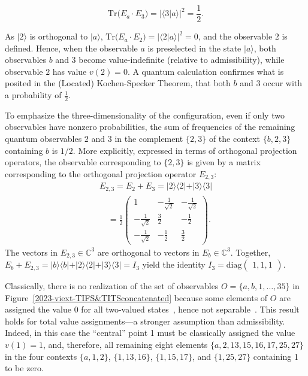 \documentclass[%
 reprint,
 superscriptaddress,
 showpacs,
 showkeys,
 nofootinbib,
  amsmath,amssymb,
 pra,
  longbibliography,
  floatfix,
 ]{revtex4-2}
\theoremstyle{definition}
\newcommand{\C}{\mathbb{C}}
\begin{document}
\begin{equation*}
\text{Tr}\big(E_a \cdot E_3 \big) = \vert \langle 3 \vert a \rangle \vert^2 = \frac12.
\end{equation*}

As $\vert 2 \rangle$ is orthogonal to $\vert a \rangle$,
$\text{Tr}\big(E_a \cdot E_2 \big) = \vert \langle 2 \vert a \rangle \vert^2 = 0$,
and the observable $2$ is defined.
Hence, when the observable $a$ is preselected in the state $\vert a \rangle$, both observables $b$ and $3$ become value-indefinite (relative to admissibility),
while observable $2$ has value  $v(2) = 0$.
A quantum calculation confirmes what is posited in the (Located) Kochen-Specker Theorem,
that both $b$ and $3$ occur with a probability of $\frac12$.


To emphasize the three-dimensionality of the configuration, even if only two observables have nonzero probabilities,  the sum of frequencies of the remaining quantum observables $2$ and $3$
 in the complement  $\{2,3\}$ of the context $\{b,2,3\}$ containing $b$ is $1/2$.
More explicitly, expressed in terms of orthogonal projection operators, the observable corresponding to $\{2,3\}$
is given by a  matrix  corresponding to the orthogonal projection operator $E_{2,3}$:
\begin{equation}
\begin{split}
E_{2,3}=E_2 + E_3 = \vert 2 \rangle \langle 2 \vert + \vert 3 \rangle \langle 3 \vert \\
\quad = \frac12
\begin{pmatrix}
1 & -\frac1{\sqrt{2}}& -\frac1{\sqrt{2}}\\
-\frac1{\sqrt{2}}& \frac32& -\frac12\\
-\frac1{\sqrt{2}}& -\frac12& \frac32
\end{pmatrix}
.
\end{split}
\label{2023-viext-sumotopo}
\end{equation}
The vectors in $E_{2,3}\in \C^3$ are orthogonal to vectors in  $E_{b}\in \C^3$.
Together, $E_b+E_{2,3} =\vert b \rangle \langle b \vert +\vert 2 \rangle \langle 2 \vert + \vert 3 \rangle \langle 3 \vert =I_3$ yield
the identity $I_3=\text{diag}\begin{pmatrix}1,1,1\end{pmatrix}$.

Classically, there is no realization of the set of observables $O=\{ a, b, 1,\ldots , 35\}$ in Figure~\ref{2023-viext-TIFS&TITSconcatenated} because
some elements of $O$ are assigned the value $0$ for all two-valued states~\cite[Table~24.1]{Svozil-2018-p}, hence
not separable~\cite[Theorem~0]{kochen1}.  This result holds for total value assignments---a stronger assumption than admissibility.
Indeed, in this case  the ``central'' point 1 must be classically assigned the value $v(1)=1$,
and, therefore, all remaining eight elements
$\{a, 2, 13, 15, 16, 17, 25, 27\}$
in the four contexts
$\{a,1,2\}$, $\{1,13,16\}$, $\{1,15,17\}$, and $\{1,25,27\}$ containing 1 to be zero.
\end{document}
